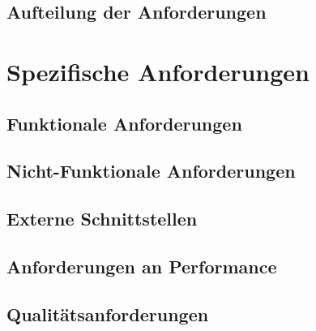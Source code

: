 \documentclass[a4paper]{book}
\begin{document}
\section{Aufteilung der Anforderungen}
\blindtext

\chapter{Spezifische Anforderungen}
\blindtext

\section{Funktionale Anforderungen}
\blindtext

\section{Nicht-Funktionale Anforderungen}
\blindtext

\section{Externe Schnittstellen}
\blindtext

\section{Anforderungen an Performance}
\blindtext

\section{Qualitätsanforderungen}
\blindtext
\end{document}
